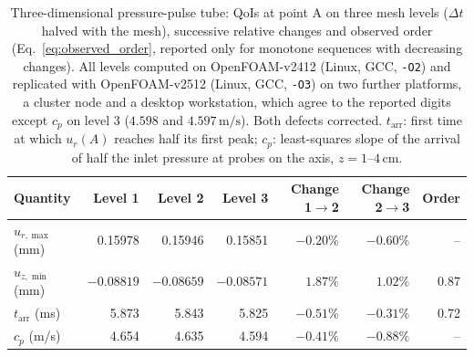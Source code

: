 \begin{table}[htbp]
	\centering
	\small
	\setlength{\tabcolsep}{4pt}
	\caption{Three-dimensional pressure-pulse tube: QoIs at point A on three mesh levels ($\Delta t$ halved with the mesh), successive relative changes and observed order (Eq.~\eqref{eq:observed_order}, reported only for monotone sequences with decreasing changes). All levels computed on OpenFOAM-v2412 (Linux, GCC, \texttt{-O2}) and replicated with OpenFOAM-v2512 (Linux, GCC, \texttt{-O3}) on two further platforms, a cluster node and a desktop workstation, which agree to the reported digits except $c_p$ on level 3 ($4.598$ and $4.597\,\mathrm{m/s}$). Both defects corrected. $t_\mathrm{arr}$: first time at which $u_r(A)$ reaches half its first peak; $c_p$: least-squares slope of the arrival of half the inlet pressure at probes on the axis, $z = 1$--$4\,\mathrm{cm}$.}
	\label{tab:3dtube}
	\begin{tabular}{lrrrrrr}
		\toprule
		Quantity & Level 1 & Level 2 & Level 3 & Change 1$\to$2 & Change 2$\to$3 & Order \\
		\midrule
		$u_{r,\max}$ (mm) & 0.15978 & 0.15946 & 0.15851 & $-0.20\%$ & $-0.60\%$ & -- \\
		$u_{z,\min}$ (mm) & $-0.08819$ & $-0.08659$ & $-0.08571$ & $1.87\%$ & $1.02\%$ & 0.87 \\
		$t_\mathrm{arr}$ (ms) & 5.873 & 5.843 & 5.825 & $-0.51\%$ & $-0.31\%$ & 0.72 \\
		$c_p$ (m/s) & 4.654 & 4.635 & 4.594 & $-0.41\%$ & $-0.88\%$ & -- \\
		\bottomrule
	\end{tabular}
\end{table}

